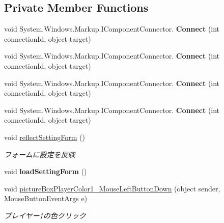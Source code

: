 \subsection*{Private Member Functions}
\begin{DoxyCompactItemize}
\item 
\mbox{\label{class_reversi_wpf_1_1_setting_window_a8f9fdc63caf9e3b78035a534a73199e3}} 
void System.\+Windows.\+Markup.\+I\+Component\+Connector. {\bfseries Connect} (int connection\+Id, object target)
\item 
\mbox{\label{class_reversi_wpf_1_1_setting_window_a8f9fdc63caf9e3b78035a534a73199e3}} 
void System.\+Windows.\+Markup.\+I\+Component\+Connector. {\bfseries Connect} (int connection\+Id, object target)
\item 
\mbox{\label{class_reversi_wpf_1_1_setting_window_a8f9fdc63caf9e3b78035a534a73199e3}} 
void System.\+Windows.\+Markup.\+I\+Component\+Connector. {\bfseries Connect} (int connection\+Id, object target)
\item 
\mbox{\label{class_reversi_wpf_1_1_setting_window_a8f9fdc63caf9e3b78035a534a73199e3}} 
void System.\+Windows.\+Markup.\+I\+Component\+Connector. {\bfseries Connect} (int connection\+Id, object target)
\item 
void \hyperlink{class_reversi_wpf_1_1_setting_window_aefc06dfe7cb0574c8a2d81eb343f13ed}{reflect\+Setting\+Form} ()
\begin{DoxyCompactList}\small\item\em フォームに設定を反映 \end{DoxyCompactList}\item 
\mbox{\label{class_reversi_wpf_1_1_setting_window_ae79fa098cb635f73cd007570dbc9e369}} 
void {\bfseries load\+Setting\+Form} ()
\item 
void \hyperlink{class_reversi_wpf_1_1_setting_window_a9d2efdfb8513a796ed4457ac8b39359f}{picture\+Box\+Player\+Color1\+\_\+\+Mouse\+Left\+Button\+Down} (object sender, Mouse\+Button\+Event\+Args e)
\begin{DoxyCompactList}\small\item\em プレイヤー1の色クリック \end{DoxyCompactList}\item 

\end{DoxyCompactItemize}
